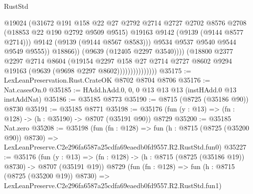 \begin{lexlean}{RustStd}
\begin{coremodule}
                                        @19024
                                        (@31672
                                          @191
                                          @158
                                          @22
                                          @27
                                          @2792
                                          @2714
                                          @2727
                                          @2702
                                          @8576
                                          @2708
                                          (@18853 @22 @190 @2792 @9509 @9515)
                                          @19163
                                          @9142
                                          (@9139 (@9144 @8577 @2714)))
                                        @9142
                                        (@9139 (@9144 @8567 @8583)))
                                      @9534
                                      @9537
                                      @9540
                                      @9544
                                      @9549
                                      @9555))
                                  @18866))
                              (@9639 (@12405 @2297 @3540))))
                          (@18800
                            @2377
                            @2297
                            @2714
                            @8604
                            (@19154
                              @2297
                              @158
                              @27
                              @2714
                              @2727
                              @8602
                              @9294
                              @19163
                              (@9639 (@9698 @2297 @8602)))))))))))))))
@35175 := LexLeanPreservation.Rust.CrateOK @8702 @8704 @8706
@35176 := Nat.casesOn.{0}
@35185 := HAdd.hAdd.{0, 0, 0} @13 @13 @13 (instHAdd.{0} @13 instAddNat)
@35186 := @35185 @8773
@35190 := @8715 (@8725 (@35186 @90)) @8730
@35191 := @35185 @8771
@35198 := @35176 (fun (y : @13) => (fn : @128) -> (h : @35190) -> @8707 (@35191 @90)) @8729
@35200 := @35185 Nat.zero
@35208 := @35198
    (fun (fn : @128) =>
    fun (h : @8715 (@8725 (@35200 @90)) @8730) =>
    LexLeanPreserve.C2e296fa6587a25cdfa69eaedb0fd9557.R2.RustStd.fun0)
@35227 := @35176
    (fun (y : @13) => (fn : @128) -> (h : @8715 (@8725 (@35186 @19)) @8730) -> @8707 (@35191 @19))
    @8729
    (fun (fn : @128) =>
    fun (h : @8715 (@8725 (@35200 @19)) @8730) =>
    LexLeanPreserve.C2e296fa6587a25cdfa69eaedb0fd9557.R2.RustStd.fun1)

\end{coremodule}
\end{lexlean}

